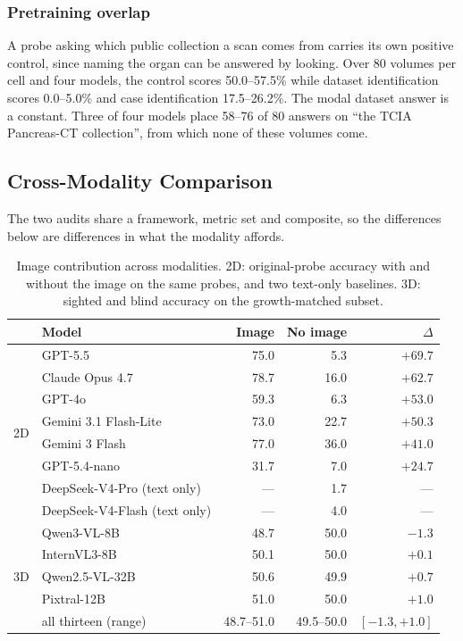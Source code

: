 \subsubsection{Pretraining overlap} A probe asking which public collection a
scan comes from carries its own positive control, since naming the organ can
be answered by looking. Over 80 volumes per cell and four models, the control
scores 50.0--57.5\% while dataset identification scores 0.0--5.0\% and case
identification 17.5--26.2\%. The modal dataset answer is a
constant. Three of four models place 58--76 of 80 answers on ``the TCIA
Pancreas-CT collection'', from which none of these volumes come.

\subsection{Cross-Modality Comparison}
\label{sec:results_cross}

The two audits share a framework, metric set and composite, so the
differences below are differences in what the modality affords.

\begin{table}[!t]
\caption{Image contribution across modalities. 2D: original-probe accuracy
with and without the image on the same probes, and two text-only baselines.
3D: sighted and blind accuracy on the growth-matched subset.}
\label{tab:imagecontrib}
\centering
\fontsize{7.2}{8.8}\selectfont
\setlength\tabcolsep{2.5pt}
\begin{tabular}{llrrr}
\toprule
 & Model & Image & No image & $\Delta$ \\
\midrule
\multirow{8}{*}{2D} & GPT-5.5 & 75.0 & 5.3 & $+69.7$ \\
 & Claude Opus 4.7 & 78.7 & 16.0 & $+62.7$ \\
 & GPT-4o & 59.3 & 6.3 & $+53.0$ \\
 & Gemini 3.1 Flash-Lite & 73.0 & 22.7 & $+50.3$ \\
 & Gemini 3 Flash & 77.0 & 36.0 & $+41.0$ \\
 & GPT-5.4-nano & 31.7 & 7.0 & $+24.7$ \\
 & DeepSeek-V4-Pro (text only) & --- & 1.7 & --- \\
 & DeepSeek-V4-Flash (text only) & --- & 4.0 & --- \\
\midrule
\multirow{5}{*}{3D} & Qwen3-VL-8B & 48.7 & 50.0 & $-1.3$ \\
 & InternVL3-8B & 50.1 & 50.0 & $+0.1$ \\
 & Qwen2.5-VL-32B & 50.6 & 49.9 & $+0.7$ \\
 & Pixtral-12B & 51.0 & 50.0 & $+1.0$ \\
 & all thirteen (range) & 48.7--51.0 & 49.5--50.0 & $[-1.3,+1.0]$ \\
\bottomrule
\end{tabular}
\end{table}

